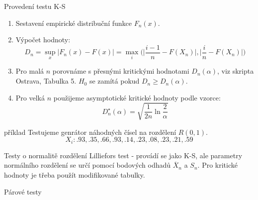 \documentclass[smaller]{beamer}
\def\abs#1{\lvert#1\rvert}
\begin{document}
\begin{frame}{Provedení testu K-S}
  \begin{enumerate}
   \item Sestavení empirické distribuční funkce $F_n(x)$.
   \item Výpočet hodnoty:
   \[
      D_n = \sup_{x} \abs{F_n(x) - F(x)} = \max_{i} \big( \abs{ \frac{i-1}{n} - F(X_n)}, \abs{\frac{i}{n} - F(X_n)} \big)
   \]
   \item Pro malá $n$ porovnáme s přesnými kritickými hodnotami $D_n(\alpha)$, viz skripta Ostrava, Tabulka 5. $H_0$ se zamítá pokud $D_n \ge D_n(\alpha)$.
   \item Pro velká $n$ použijeme asymptotické kritické hodnoty podle vzorce:
         \[
            D_n^{\star}(\alpha) = \sqrt{\frac{1}{2n} \ln\frac{2}{\alpha}}
         \]
  \end{enumerate}

\end{frame}

\begin{frame}{příklad}
 Testujeme genrátor náhodných čísel na rozdělení $R(0,1)$.
\[
X_i: .93, .35, .66, .93, .14, .23, .08, .23, .21, .59
\]


\end{frame}


\begin{frame}{Testy o normalitě rozdělení}
 {\df Lilliefors test} - provádí se jako K-S, ale parametry normálního rozdělení se určí pomocí bodových odhadů $\overline X_n$ a $S_n$.
 Pro kritické hodnoty je třeba použít modifikované tabulky.
\end{frame}

\begin{frame}{Párové testy}
\end{frame}
\end{document}
